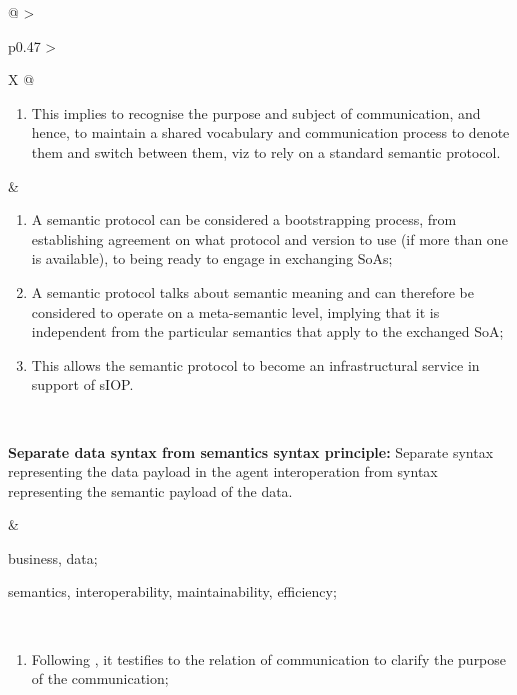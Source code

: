 \begin{xltabular}[l]{\linewidth}{@{} >{\small\raggedright\arraybackslash}p{0.47\linewidth} >{\small\raggedright\arraybackslash}X @{}}
\begin{enumerate}[left=6pt, nosep]
\begin{enumerate}
    \item enable sIOP by establishing some level of semantic compatibility;
    \item determine the alignment(s) that is/are in demand;
    \item support the comprehension process.
  \end{enumerate}
  \item This implies to recognise the purpose and subject of communication, and hence, to maintain a shared vocabulary and communication process to denote them and switch between them, viz to rely on a standard semantic protocol.
\end{enumerate}
&
\begin{enumerate}[left=10pt, nosep]
  \item A semantic protocol can be considered a bootstrapping process, from establishing agreement on what protocol and version to use (if more than one is available), to being ready to engage in exchanging SoAs;
  \item A semantic protocol talks about semantic meaning and can therefore be considered to operate on a meta-semantic level, implying that it is independent from the particular semantics that apply to the exchanged SoA;
  \item This allows the semantic protocol to become an infrastructural service in support of sIOP.
\end{enumerate} \\
%
%
%
\begin{mmdp}\label{dp:sds-ss}{\bfseries Separate data syntax from semantics syntax principle:}
\quad Separate syntax representing the data payload in the agent interoperation from syntax representing the semantic payload of the data.
\end{mmdp}
&
\begin{description}[labelwidth=3.7cm,leftmargin=3.7cm+1ex,nosep,topsep=2ex,labelsep=1ex,font=\bfseries]
  \item[Type of information:] business, data;
  \item[Quality attributes:] semantics, interoperability, maintainability, efficiency;
\end{description} \\
\begin{enumerate}[left=6pt, nosep]
  \item Following \cite{Grice:1991BT}, it testifies to the relation of communication to clarify the purpose of the communication;

\end{enumerate}
\end{xltabular}
